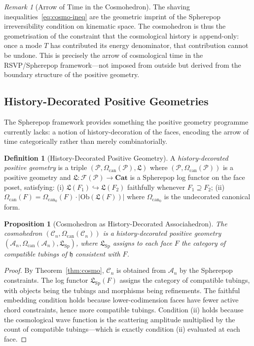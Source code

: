 \documentclass[12pt, oneside]{amsart}
\theoremstyle{plain}
\newtheorem{proposition}[theorem]{Proposition}
\theoremstyle{definition}
\newtheorem{definition}[theorem]{Definition}
\theoremstyle{remark}
\newtheorem{remark}[theorem]{Remark}
\newcommand{\hist}{\mathfrak{h}}
\newcommand{\Log}{\mathfrak{L}}
\newcommand{\Assoc}{\mathcal{A}_n}
\newcommand{\Cosmo}{\mathcal{C}_n}
\newcommand{\CF}{\Omega_{\mathrm{can}}}
\begin{document}
\begin{remark}[Arrow of Time in the Cosmohedron]
The shaving inequalities~\eqref{eq:cosmo-ineq} are the geometric imprint of the Spherepop irreversibility condition on kinematic space. The cosmohedron is thus the geometrisation of the constraint that the cosmological history is append-only: once a mode $T$ has contributed its energy denominator, that contribution cannot be undone. This is precisely the arrow of cosmological time in the RSVP/Spherepop framework---not imposed from outside but derived from the boundary structure of the positive geometry.
\end{remark}

\subsection{History-Decorated Positive Geometries}

The Spherepop framework provides something the positive geometry programme currently lacks: a notion of history-decoration of the faces, encoding the arrow of time categorically rather than merely combinatorially.

\begin{definition}[History-Decorated Positive Geometry]
A \emph{history-decorated positive geometry} is a triple $(\mathcal{P}, \CF(\mathcal{P}), \Log)$ where $(\mathcal{P}, \CF(\mathcal{P}))$ is a positive geometry and $\Log: \mathcal{F}(\mathcal{P}) \to \mathbf{Cat}$ is a Spherepop log functor on the face poset, satisfying: (i) $\Log(F_1) \hookrightarrow \Log(F_2)$ faithfully whenever $F_1 \supseteq F_2$; (ii) $\CF(F) = \CF_0(F) \cdot |\mathrm{Ob}(\Log(F))|$ where $\CF_0$ is the undecorated canonical form.
\end{definition}

\begin{proposition}[Cosmohedron as History-Decorated Associahedron]
The cosmohedron $(\Cosmo, \CF(\Cosmo))$ is a history-decorated positive geometry $(\Assoc, \CF(\Assoc), \Log_{\mathrm{Sp}})$, where $\Log_{\mathrm{Sp}}$ assigns to each face $F$ the category of compatible tubings of $\hist$ consistent with $F$.
\end{proposition}

\begin{proof}
By Theorem~\ref{thm:cosmo}, $\Cosmo$ is obtained from $\Assoc$ by the Spherepop constraints. The log functor $\Log_{\mathrm{Sp}}(F)$ assigns the category of compatible tubings, with objects being the tubings and morphisms being refinements. The faithful embedding condition holds because lower-codimension faces have fewer active chord constraints, hence more compatible tubings. Condition (ii) holds because the cosmological wave function is the scattering amplitude multiplied by the count of compatible tubings---which is exactly condition (ii) evaluated at each face.
\end{proof}
\end{document}
